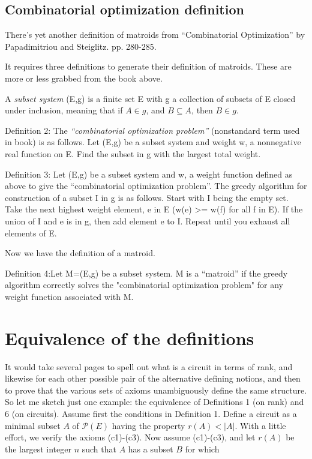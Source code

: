 \documentclass[12pt]{article}
\begin{document}
\subsection*{Combinatorial optimization definition}

There's yet another definition of matroids from ``Combinatorial Optimization'' by Papadimitriou and Steiglitz. pp. 280-285. 

It requires three definitions to generate their definition of matroids. These are more or less grabbed from the book above.

A {\em subset system} (E,g) is a finite set E with g a collection of subsets of E closed under inclusion, meaning that if $A\in g$, and $B\subseteq A$, then $B\in g$.

Definition 2: The {\em ``combinatorial optimization problem''} (nonstandard term used in book) is as follows. Let (E,g) be a subset system and weight w, a nonnegative real function on E. Find the subset in g with the largest total weight.

Definition 3: Let (E,g) be a subset system and w, a weight function defined as above to give the ``combinatorial optimization problem''. The greedy algorithm for construction of a subset I in g is as follows. Start with I being the empty set. Take the next highest weight element, e in E (w(e) >= w(f) for all f in E). If the union of I and {e} is in g, then add element e to I. Repeat until you exhaust all elements of E.

Now we have the definition of a matroid.

Definition 4:Let M=(E,g) be a subset system. M is a ``matroid'' if the greedy algorithm correctly solves the "combinatorial optimization problem" for any weight function associated with M.

\section{Equivalence of the definitions}
It would take several pages to spell out what is a circuit in terms of rank,
and likewise for each other possible pair of the alternative defining notions,
and then to prove that the various sets of axioms unambiguously define the
same structure.
So let me sketch just one example: the equivalence of Definitions 1 (on
rank) and 6 (on circuits).
Assume first the conditions in Definition 1.
Define a circuit as a minimal subset $A$ of $\mathcal{P}(E)$ having the property
$r(A)<|A|$.
With a little effort, we verify the axioms (c1)-(c3).
Now assume (c1)-(c3), and let $r(A)$ be the largest
integer $n$ such that $A$ has a subset $B$ for which
\end{document}
